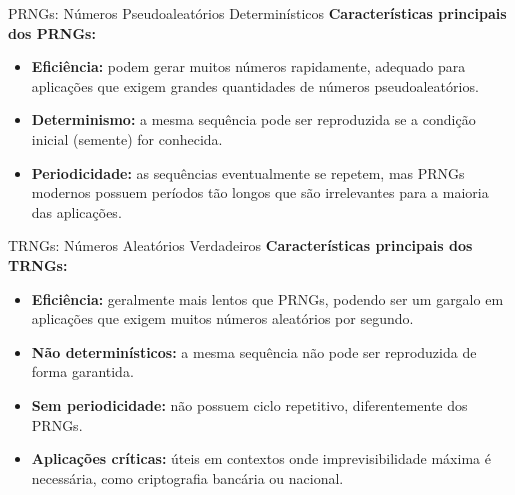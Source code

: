 \begin{frame}{PRNGs: Números Pseudoaleatórios Determinísticos}
\textbf{Características principais dos PRNGs:}

\begin{itemize}
    \item \textbf{Eficiência:} podem gerar muitos números rapidamente, adequado para aplicações que exigem grandes quantidades de números pseudoaleatórios.
    \item \textbf{Determinismo:} a mesma sequência pode ser reproduzida se a condição inicial (semente) for conhecida.
    \item \textbf{Periodicidade:} as sequências eventualmente se repetem, mas PRNGs modernos possuem períodos tão longos que são irrelevantes para a maioria das aplicações.
\end{itemize}

\end{frame}

\begin{frame}{TRNGs: Números Aleatórios Verdadeiros}
\textbf{Características principais dos TRNGs:}

\begin{itemize}
    \item \textbf{Eficiência:} geralmente mais lentos que PRNGs, podendo ser um gargalo em aplicações que exigem muitos números aleatórios por segundo.
    \item \textbf{Não determinísticos:} a mesma sequência não pode ser reproduzida de forma garantida.
    \item \textbf{Sem periodicidade:} não possuem ciclo repetitivo, diferentemente dos PRNGs.
    \item \textbf{Aplicações críticas:} úteis em contextos onde imprevisibilidade máxima é necessária, como criptografia bancária ou nacional.
\end{itemize}

\end{frame}

